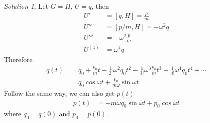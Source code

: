 \documentclass[twoside,11pt]{article}
\theoremstyle{definition}
\theoremstyle{remark}
\newtheorem*{solution}{Solution}
\begin{document}
\begin{solution} 
Let $G=H$, $U=q$, then
\begin{align*}
    U' &= [q, H] = \frac{p}{m}\\
    U'' &= [p/m, H] = -\omega^2 q\\
    U''' &= -\omega^2 \frac{p}{m}\\
    U^{(4)} &= \omega^4 q
\end{align*}
Therefore
\begin{align*}
    q(t) &= q_0 + \frac{p_0}{m}t - \frac{1}{2!}\omega^2q_0 t^2 - \frac{1}{3!}
    \omega^3 \frac{p_0}{m} t^3 
    + \frac{1}{4!}\omega^4 q_0 t^4 + \cdots\\
         &= q_0\cos\omega t + \frac{p_0}{m\omega}\sin\omega t
\end{align*}
Follow the same way, we can also get $p(t)$
\begin{align*}
    p(t) &= -m\omega q_0\sin\omega t + p_0\cos\omega t
\end{align*}
where $q_0=q(0)$ and $p_0=p(0)$.

\end{solution}


\end{document}
